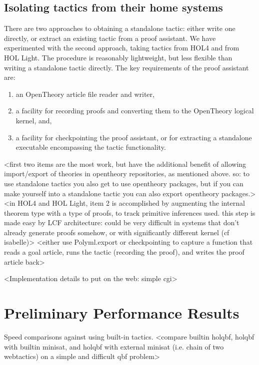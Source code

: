 \documentclass{llncs}
\newcommand{\OpenTheory}{OpenTheory\xspace}
\begin{document}
\subsection{Isolating tactics from their home systems}
There are two approaches to obtaining a standalone tactic: either write one directly, or extract an existing tactic from a proof assistant. 
We have experimented with the second approach, taking tactics from HOL4 and from HOL Light.
The procedure is reasonably lightweight, but less flexible than writing a standalone tactic directly.
The key requirements of the proof assistant are:
\begin{enumerate}
\item
\label{req:io} an \OpenTheory article file reader and writer,
\item
\label{req:log} a facility for recording proofs and converting them to the \OpenTheory logical kernel, and,
\item
\label{req:ckpt} a facility for checkpointing the proof assistant, or for extracting a standalone executable encompassing the tactic functionality.
\end{enumerate}
<first two items are the most work, but have the additional benefit of allowing import/export of theories in opentheory repositories, as mentioned above. so: to use standalone tactics you also get to use opentheory packages, but if you can make yourself into a standalone tactic you can also export opentheory packages.>
<in HOL4 and HOL Light, item 2 is accomplished by augmenting the internal theorem type with a type of proofs, to track primitive inferences used. this step is made easy by LCF architecture: could be very difficult in systems that don't already generate proofs somehow, or with significantly different kernel (cf isabelle)>
<either use Polyml.export or checkpointing to capture a function that reads a goal article, runs the tactic (recording the proof), and writes the proof article back>

<Implementation details to put on the web: simple cgi>

\section{Preliminary Performance Results}
\label{sec:performance}

Speed comparisons against using built-in tactics.
<compare builtin holqbf, holqbf with builtin minisat, and holqbf with external minisat (i.e. chain of two webtactics) on a simple and difficult qbf problem>
\end{document}
